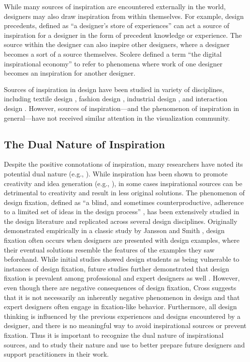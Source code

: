 While many sources of inspiration are encountered externally in the world, designers may also draw inspiration from within themselves. For example, design precedents, defined as ``a designer's store of experiences'' \cite[p. 1]{boling_nature_2021} can act a source of inspiration for a designer in the form of precedent knowledge or experience. The source within the designer can also inspire other designers, where a designer becomes a sort of a source themselves. Scolere \cite{scolere_digital_2021} defined a term ``the digital inspirational economy'' to refer to phenomena where work of one designer becomes an inspiration for another designer. 

Sources of inspiration in design have been studied in variety of disciplines, including textile design \cite{eckert_sources_2000}, fashion design \cite{mete_creative_2006}, industrial design \cite{santulli_introducing_2011}, and interaction design \cite{halskov_kinds_2010}. However, sources of inspiration---and the phenomenon of inspiration in general---have not received similar attention in the visualization community.

\subsection{The Dual Nature of Inspiration}
\label{sec:dual}
Despite the positive connotations of inspiration, many researchers have noted its potential dual nature (e.g., \cite{cai_extended_2010}). While inspiration has been shown to promote creativity and idea generation (e.g., \cite{santulli_introducing_2011, goldschmidt_inspiring_2011}), in some cases inspirational sources can be detrimental to creativity and result in less original solutions. The phenomenon of design fixation, defined as ``a blind, and sometimes counterproductive, adherence to a limited set of ideas in the design process'' \cite[p. 4]{jansson_design_1991}, has been extensively studied in the design literature and replicated across several design disciplines. Originally demonstrated empirically in a classic study by Jansson and Smith \cite{jansson_design_1991}, design fixation often occurs when designers are presented with design examples, where their eventual solutions resemble the features of the examples they saw beforehand. While initial studies showed design students as being vulnerable to instances of design fixation, future studies further demonstrated that design fixation is prevalent among professional and expert designers as well \cite{viswanathan_study_2012, crilly_fixation_2015, condoor_design_2007, kim_design_2014, linsey_study_2010, viswanathan_design_2013}. However, even though there are negative consequences of design fixation, Cross \cite{Cross2001} suggests that it is not necessarily an inherently negative phenomenon in design and that expert designers often engage in fixation-like behavior. Furthermore, all design thinking is influenced by the previous experiences and designs encountered by a designer, and there is no meaningful way to avoid inspirational sources or prevent fixation. Thus it is important to recognize the dual nature of inspirational sources, and to study their nature and use to better prepare future designers and support practitioners in their work.


